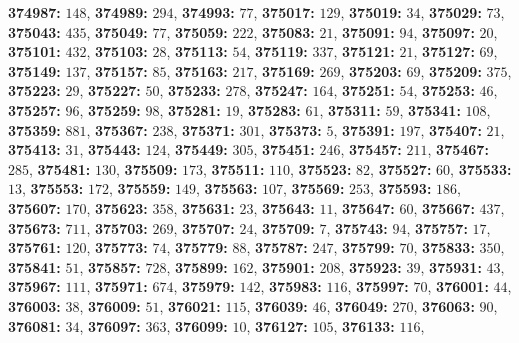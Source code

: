 \textsf{\bfseries 374987:} $148$, \textsf{\bfseries 374989:} $294$, \textsf{\bfseries 374993:} $77$, \textsf{\bfseries 375017:} $129$, \textsf{\bfseries 375019:} $34$, \textsf{\bfseries 375029:} $73$, \textsf{\bfseries 375043:} $435$, \textsf{\bfseries 375049:} $77$, \textsf{\bfseries 375059:} $222$, \textsf{\bfseries 375083:} $21$, \textsf{\bfseries 375091:} $94$, \textsf{\bfseries 375097:} $20$, \textsf{\bfseries 375101:} $432$, \textsf{\bfseries 375103:} $28$, \textsf{\bfseries 375113:} $54$, \textsf{\bfseries 375119:} $337$, \textsf{\bfseries 375121:} $21$, \textsf{\bfseries 375127:} $69$, \textsf{\bfseries 375149:} $137$, \textsf{\bfseries 375157:} $85$, \textsf{\bfseries 375163:} $217$, \textsf{\bfseries 375169:} $269$, \textsf{\bfseries 375203:} $69$, \textsf{\bfseries 375209:} $375$, \textsf{\bfseries 375223:} $29$, \textsf{\bfseries 375227:} $50$, \textsf{\bfseries 375233:} $278$, \textsf{\bfseries 375247:} $164$, \textsf{\bfseries 375251:} $54$, \textsf{\bfseries 375253:} $46$, \textsf{\bfseries 375257:} $96$, \textsf{\bfseries 375259:} $98$, \textsf{\bfseries 375281:} $19$, \textsf{\bfseries 375283:} $61$, \textsf{\bfseries 375311:} $59$, \textsf{\bfseries 375341:} $108$, \textsf{\bfseries 375359:} $881$, \textsf{\bfseries 375367:} $238$, \textsf{\bfseries 375371:} $301$, \textsf{\bfseries 375373:} $5$, \textsf{\bfseries 375391:} $197$, \textsf{\bfseries 375407:} $21$, \textsf{\bfseries 375413:} $31$, \textsf{\bfseries 375443:} $124$, \textsf{\bfseries 375449:} $305$, \textsf{\bfseries 375451:} $246$, \textsf{\bfseries 375457:} $211$, \textsf{\bfseries 375467:} $285$, \textsf{\bfseries 375481:} $130$, \textsf{\bfseries 375509:} $173$, \textsf{\bfseries 375511:} $110$, \textsf{\bfseries 375523:} $82$, \textsf{\bfseries 375527:} $60$, \textsf{\bfseries 375533:} $13$, \textsf{\bfseries 375553:} $172$, \textsf{\bfseries 375559:} $149$, \textsf{\bfseries 375563:} $107$, \textsf{\bfseries 375569:} $253$, \textsf{\bfseries 375593:} $186$, \textsf{\bfseries 375607:} $170$, \textsf{\bfseries 375623:} $358$, \textsf{\bfseries 375631:} $23$, \textsf{\bfseries 375643:} $11$, \textsf{\bfseries 375647:} $60$, \textsf{\bfseries 375667:} $437$, \textsf{\bfseries 375673:} $711$, \textsf{\bfseries 375703:} $269$, \textsf{\bfseries 375707:} $24$, \textsf{\bfseries 375709:} $7$, \textsf{\bfseries 375743:} $94$, \textsf{\bfseries 375757:} $17$, \textsf{\bfseries 375761:} $120$, \textsf{\bfseries 375773:} $74$, \textsf{\bfseries 375779:} $88$, \textsf{\bfseries 375787:} $247$, \textsf{\bfseries 375799:} $70$, \textsf{\bfseries 375833:} $350$, \textsf{\bfseries 375841:} $51$, \textsf{\bfseries 375857:} $728$, \textsf{\bfseries 375899:} $162$, \textsf{\bfseries 375901:} $208$, \textsf{\bfseries 375923:} $39$, \textsf{\bfseries 375931:} $43$, \textsf{\bfseries 375967:} $111$, \textsf{\bfseries 375971:} $674$, \textsf{\bfseries 375979:} $142$, \textsf{\bfseries 375983:} $116$, \textsf{\bfseries 375997:} $70$, \textsf{\bfseries 376001:} $44$, \textsf{\bfseries 376003:} $38$, \textsf{\bfseries 376009:} $51$, \textsf{\bfseries 376021:} $115$, \textsf{\bfseries 376039:} $46$, \textsf{\bfseries 376049:} $270$, \textsf{\bfseries 376063:} $90$, \textsf{\bfseries 376081:} $34$, \textsf{\bfseries 376097:} $363$, \textsf{\bfseries 376099:} $10$, \textsf{\bfseries 376127:} $105$, \textsf{\bfseries 376133:} $116$, 
